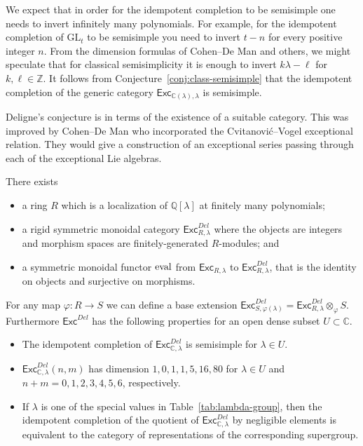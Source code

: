 \documentclass[12pt]{amsart}
\begin{document}
We expect that in order for the idempotent completion to be semisimple one
needs to invert infinitely many polynomials.  For example, for the idempotent
completion of $\mathrm{GL}_t$ to be semisimple you need to invert $t-n$ for
every positive integer $n$.  From the dimension formulas of Cohen--De Man and
others, we might speculate that for classical semisimplicity it is
enough to invert $k\lambda-\ell$ for $k, \ell \in \mathbb{Z}$. It
follows from Conjecture~\ref{conj:class-semisimple} that the
idempotent completion of the generic category
$\mathsf{Exc}_{\mathbb{C}(\lambda),\lambda}$ is semisimple.

Deligne's conjecture \cite{MR1378507} is in terms of the existence of
a suitable category. This was
improved by Cohen--De Man \cite{MR1714606} who incorporated the
Cvitanović--Vogel exceptional
relation. They would give a construction of an exceptional series passing
through each of the exceptional Lie algebras.

\begin{conjecture}\label{conj:Deligne}
There exists
  \begin{itemize}
  \item a ring $R$ which is a localization of $\mathbb{Q}[\lambda]$ at finitely many polynomials;
  \item a rigid symmetric monoidal category
    $\mathsf{Exc}^{Del}_{R,\lambda}$ where the objects are
    integers and morphism spaces are finitely-generated
    $R$-modules; and
  \item a symmetric monoidal functor $\operatorname{eval}$ from
    $\mathsf{Exc}_{R,\lambda}$ to $\mathsf{Exc}^{Del}_{R,\lambda}$, that
    is the identity on objects and surjective on morphisms.  
  \end{itemize}
For any map $\varphi\colon R \rightarrow S$ we can define a base
extension $\mathsf{Exc}^{Del}_{S,\varphi(\lambda)} =
\mathsf{Exc}^{Del}_{R,\lambda} \otimes_\varphi S$.  Furthermore
$\mathsf{Exc}^{Del}$ has the following properties for an open dense subset
$U \subset \mathbb{C}$.
\begin{itemize}
\item The idempotent completion of
  $\mathsf{Exc}^{Del}_{\mathbb{C},\lambda}$ is semisimple for $\lambda \in U$.
\item $\mathsf{Exc}^{Del}_{\mathbb{C},\lambda}(n,m)$ has dimension $1,\allowbreak0,\allowbreak1,\allowbreak1,\allowbreak5,\allowbreak16,\allowbreak80$
for $\lambda \in U$ and $n+m=0,1,2,3,4,5,6$, respectively.
\item If $\lambda$ is one of the special values in
  Table~\ref{tab:lambda-group}, then the idempotent completion of the
  quotient of
  $\mathsf{Exc}^{Del}_{\mathbb{C},\lambda}$ by negligible elements is
  equivalent to the category of representations of the corresponding
  supergroup.
\end{itemize}
\end{conjecture}
\end{document}
